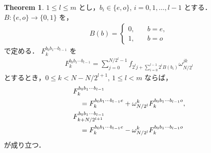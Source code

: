 \documentclass[twocolumn, uplatex, dvipdfmx]{jsarticle}
\renewcommand{\le}{\leqslant}
\numberwithin{equation}{section}
\theoremstyle{definition}
\newtheorem{thm}{Theorem}[section]
\begin{document}
\begin{thm}
	$1\le l\le m$ とし，$b_i\in\{e,o\}$, $i=0,1,\dots,l-1$ とする．
	$B:\{e,o\}\to\{0,1\}$ を，
	\begin{align}
		B(b)=\begin{cases}
			0,&\quad b=e,\\
			1,&\quad b=o
		\end{cases}
	\end{align}
	で定める．
	$F_k^{b_0b_1\cdots b_{l-1}}$ を
	\begin{align}
		F_k^{b_0b_1\cdots b_{l-1}}=\sum_{j=0}^{N/2^l-1}f_{2^lj+\sum_{i=0}^{l-1}2^iB(b_i)}\omega_{N/2^l}^{jk}
	\end{align}
	とするとき，$0\le k<N-N/2^{l+1}$, $1\le l<m$ ならば，
	\begin{align}
		&F_k^{b_0b_1\cdots b_{l-1}}\notag\\
		&\quad=F_k^{b_0b_1\cdots b_{l-1}e}+\omega_{N/2^l}^kF_k^{b_0b_1\cdots b_{l-1}o},\\
		&F_{k+N/2^{l+1}}^{b_0b_1\cdots b_{l-1}}\notag\\
		&\quad=F_k^{b_0b_1\cdots b_{l-1}e}-\omega_{N/2^l}^kF_k^{b_0b_1\cdots b_{l-1}o}
	\end{align}
	が成り立つ．
\end{thm}
\end{document}
